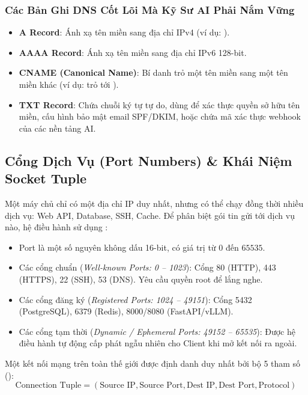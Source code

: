 \subsubsection{Các Bản Ghi DNS Cốt Lõi Mà Kỹ Sư AI Phải Nắm Vững}
\begin{itemize}
  \item \textbf{A Record}: Ánh xạ tên miền sang địa chỉ IPv4 (ví dụ: ).
  \item \textbf{AAAA Record}: Ánh xạ tên miền sang địa chỉ IPv6 128-bit.
  \item \textbf{CNAME (Canonical Name)}: Bí danh trỏ một tên miền sang một tên miền khác (ví dụ:  trỏ tới ).
  \item \textbf{TXT Record}: Chứa chuỗi ký tự tự do, dùng để xác thực quyền sở hữu tên miền, cấu hình bảo mật email SPF/DKIM, hoặc chứa mã xác thực webhook của các nền tảng AI.
\end{itemize}

\subsection{Cổng Dịch Vụ (Port Numbers) \& Khái Niệm Socket Tuple}
Một máy chủ chỉ có một địa chỉ IP duy nhất, nhưng có thể chạy đồng thời nhiều dịch vụ: Web API, Database, SSH, Cache. Để phân biệt gói tin gửi tới dịch vụ nào, hệ điều hành sử dụng :
\begin{itemize}
  \item Port là một số nguyên không dấu 16-bit, có giá trị từ $0$ đến $65535$.
  \item Các cổng chuẩn (\textit{Well-known Ports: 0 -- 1023}): Cổng 80 (HTTP), 443 (HTTPS), 22 (SSH), 53 (DNS). Yêu cầu quyền root để lắng nghe.
  \item Các cổng đăng ký (\textit{Registered Ports: 1024 -- 49151}): Cổng 5432 (PostgreSQL), 6379 (Redis), 8000/8080 (FastAPI/vLLM).
  \item Các cổng tạm thời (\textit{Dynamic / Ephemeral Ports: 49152 -- 65535}): Được hệ điều hành tự động cấp phát ngẫu nhiên cho Client khi mở kết nối ra ngoài.
\end{itemize}

Một kết nối mạng trên toàn thế giới được định danh duy nhất bởi bộ 5 tham số ():
\begin{equation}
\text{Connection Tuple} = (\text{Source IP}, \text{Source Port}, \text{Dest IP}, \text{Dest Port}, \text{Protocol})
\end{equation}

